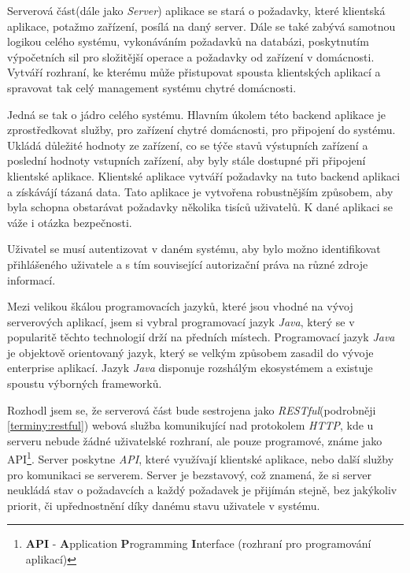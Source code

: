 Serverová část(dále jako \emph{Server}) aplikace se stará o požadavky, které klientská aplikace, potažmo zařízení, posílá na daný server.
Dále se také zabývá samotnou logikou celého systému, vykonáváním požadavků na databázi, poskytnutím výpočetních sil pro složitější operace a požadavky od zařízení v domácnosti.
Vytváří rozhraní, ke kterému může přistupovat spousta klientských aplikací a spravovat tak celý management systému chytré domácnosti.

Jedná se tak o jádro celého systému.
Hlavním úkolem této backend aplikace je zprostředkovat služby, pro zařízení chytré domácnosti, pro připojení do systému.
Ukládá důležité hodnoty ze zařízení, co se týče stavů výstupních zařízení a poslední hodnoty vstupních zařízení, aby byly stále dostupné při připojení klientské aplikace.
Klientské aplikace vytváří požadavky na tuto backend aplikaci a získávájí tázaná data.
Tato aplikace je vytvořena robustnějším způsobem, aby byla schopna obstarávat požadavky několika tisíců uživatelů.
K dané aplikaci se váže i otázka bezpečnosti.

Uživatel se musí autentizovat v daném systému, aby bylo možno identifikovat přihlášeného uživatele a s tím související autorizační práva na různé zdroje informací.

Mezi velikou škálou programovacích jazyků, které jsou vhodné na vývoj serverových aplikací, jsem si vybral programovací jazyk \emph{Java},
který se v popularitě těchto technologií drží na předních místech. Programovací jazyk \emph{Java} je objektově orientovaný jazyk, který se velkým způsobem zasadil do vývoje enterprise aplikací.
Jazyk \emph{Java} disponuje rozshálým ekosystémem a existuje spoustu výborných frameworků.

Rozhodl jsem se, že serverová část bude sestrojena jako \emph{RESTful}(podrobněji \ref{terminy:restful}) webová služba komunikující nad protokolem \emph{HTTP},
kde u serveru nebude žádné uživatelské rozhraní, ale pouze programové, známe jako API\footnote{\textbf{API} - \textbf{A}pplication \textbf{P}rogramming \textbf{I}nterface (rozhraní pro programování aplikací)}.
Server poskytne \emph{API}, které využívají klientské aplikace, nebo další služby pro komunikaci se serverem.
Server je bezstavový, což znamená, že si server neukládá stav o požadavcích a každý požadavek je přijímán stejně, bez jakýkoliv priorit, či upřednostnění díky danému stavu uživatele v systému.

